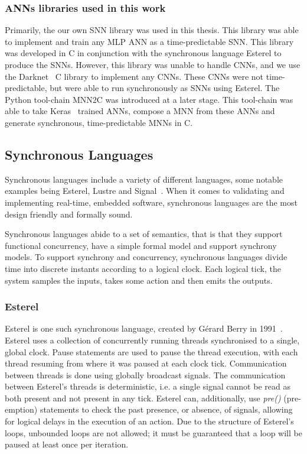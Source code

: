 \subsubsection{\acfp{ANN} libraries used in this work}
Primarily, the our own \ac{SNN} library was used in this thesis.
This library was able to implement and train any \ac{MLP} \ac{ANN} as a time-predictable \ac{SNN}.
This library was developed in C in conjunction with the synchronous language Esterel to produce the \acp{SNN}.
However, this library was unable to handle \acp{CNN}, and we use the Darknet~\cite{darknet13} C library to implement any \acp{CNN}.
These \acp{CNN} were not time-predictable, but were able to run synchronously as \acp{SNN} using Esterel.
The Python tool-chain \acf{MNN2C} was introduced at a later stage.
This tool-chain was able to take Keras~\cite{chollet2015keras} trained \acp{ANN}, compose a \acf{MNN} from these \acp{ANN} and generate synchronous, time-predictable \acp{MNN} in C.  

\subsection{Synchronous Languages}
Synchronous languages include a variety of different languages, some notable examples being Esterel, Lustre and Signal~\cite{benveniste2003synchronous}.
When it comes to validating and implementing real-time, embedded software, synchronous languages are the most design friendly and formally sound.

Synchronous languages abide to a set of semantics, that is that they support functional concurrency, have a simple formal model and support synchrony models.
To support synchrony and concurrency, synchronous languages divide time into discrete instants according to a logical clock.
Each logical tick, the system samples the inputs, takes some action and then emits the outputs.

\subsubsection{Esterel}
Esterel is one such synchronous language, created by Gérard Berry in 1991~\cite{berry1991}. 
Esterel uses a collection of concurrently running threads synchronised to a single, global clock.
Pause statements are used to pause the thread execution, with each thread resuming from where it was paused at each clock tick.
Communication between threads is done using globally broadcast signals.
The communication between Esterel's threads is deterministic, i.e. a single signal cannot be read as both present and not present in any tick.
Esterel can, additionally, use \textit{pre()} (pre-emption) statements to check the past presence, or absence, of signals, allowing for logical delays in the execution of an action.
Due to the structure of Esterel's loops, unbounded loops are not allowed; it must be guaranteed that a loop will be paused at least once per iteration.

